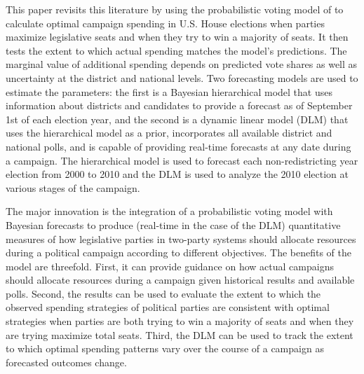 \documentclass[12pt,final,fleqn]{article}
\theoremstyle{plain}
\begin{document}
This paper revisits this literature by using the probabilistic voting model of \citet{stromberg2008electoral} to calculate optimal campaign spending in U.S. House elections when parties maximize legislative seats and when they try to win a majority of seats. It then tests the extent to which actual spending matches the model's predictions. The marginal value of additional spending depends on predicted vote shares as well as uncertainty at the district and national levels. Two forecasting models are used to estimate the parameters: the first is a Bayesian hierarchical model that uses information about districts and candidates to provide a forecast as of September 1st of each election year, and the second is a dynamic linear model (DLM) that uses the hierarchical model as a prior, incorporates all available district and national polls, and is capable of providing real-time forecasts at any date during a campaign. The hierarchical model is used to forecast each non-redistricting year election from 2000 to 2010 and the DLM is used to analyze the 2010 election at various stages of the campaign.

The major innovation is the integration of a probabilistic voting model with Bayesian forecasts to produce (real-time in the case of the DLM) quantitative measures of how legislative parties in two-party systems should allocate resources during a political campaign according to different objectives. The benefits of the model are threefold. First, it can provide guidance on how actual campaigns should allocate resources during a campaign given historical results and available polls. Second, the results can be used to evaluate the extent to which the observed spending strategies of political parties are consistent with optimal strategies when parties are both trying to win a majority of seats and when they are trying maximize total seats. Third, the DLM can be used to track the extent to which optimal spending patterns vary over the course of a campaign as forecasted outcomes change.
\end{document}
